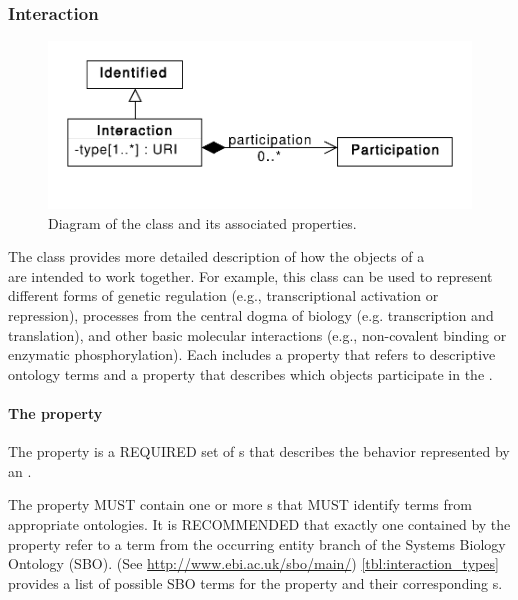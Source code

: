 \subsubsection{Interaction}
\label{sec:Interaction}

\begin{figure}[ht]
\begin{center}
\includegraphics[scale=0.6]{uml/interaction}
\caption[]{Diagram of the  class and its associated properties.}
\label{uml:interaction}
\end{center}
\end{figure}

The  class provides more detailed description of how the  objects of a\\  are intended to work together.
For example, this class can be used to represent different forms of genetic regulation (e.g., transcriptional activation or repression), processes from the central dogma of biology (e.g. transcription and translation), and other basic molecular interactions (e.g., non-covalent binding or enzymatic phosphorylation).
Each  includes a  property that refers to descriptive ontology terms and a  property that describes which  objects participate in the .

\paragraph{The  property}\label{sec:types:I}

The  property is a REQUIRED set of s that describes the behavior represented by an .

The  property MUST contain one or more s that MUST identify terms from appropriate ontologies. It is RECOMMENDED that exactly one  contained by the  property refer to a term from the occurring entity branch of the Systems Biology Ontology (SBO). (See \url{http://www.ebi.ac.uk/sbo/main/}) \ref{tbl:interaction_types} provides a list of possible SBO terms for the  property and their corresponding s.

